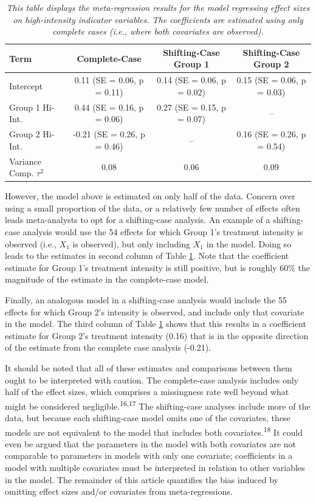 \documentclass[
]{article}
\begin{document}
\begin{table}

\caption{\label{tab:unnamed-chunk-3}\label{tab:ccadtexample} \textit{This table displays the meta-regression results for the model regressing effect sizes on high-intensity indicator variables. The coefficients are estimated using only complete cases (i.e., where both covariates are observed).}}
\centering
\begin{tabular}[t]{lccc}
\toprule
Term & Complete-Case & Shifting-Case Group 1 & Shifting-Case Group 2\\
\midrule
Intercept & 0.11 (SE = 0.06, p = 0.11) & 0.14 (SE = 0.06, p = 0.02) & 0.15 (SE = 0.06, p = 0.03)\\
Group 1 Hi-Int. & 0.44 (SE = 0.16, p = 0.06) & 0.27 (SE = 0.15, p = 0.07) & --\\
Group 2 Hi-Int. & -0.21 (SE = 0.26, p = 0.46) & -- & 0.16 (SE = 0.26, p = 0.54)\\
Variance Comp. $\tau^2$ & 0.08 & 0.06 & 0.09\\
\bottomrule
\end{tabular}
\end{table}

However, the model above is estimated on only half of the data.
Concern over using a small proportion of the data, or a relatively few number of effects often leads meta-analysts to opt for a shifting-case analysis.
An example of a shifting-case analysis would use the 54 effects for which Group 1's treatment intensity is observed (i.e., \(X_{1}\) is observed), but only including \(X_{1}\) in the model.
Doing so leads to the estimates in second column of Table \ref{tab:ccadtexample}.
Note that the coefficient estimate for Group 1's treatment intensity is still positive, but is roughly 60\% the magnitude of the estimate in the complete-case model.

Finally, an analogous model in a shifting-case analysis would include the 55 effects for which Group 2's intensity is observed, and include only that covariate in the model.
The third column of Table \ref{tab:ccadtexample} shows that this results in a coefficient estimate for Group 2's treatment intensity (0.16) that is in the opposite direction of the estimate from the complete case analysis (-0.21).

It should be noted that all of these estimates and comparisons between them ought to be interpreted with caution.
The complete-case analysis includes only half of the effect sizes, which comprises a missingness rate well beyond what might be considered negligible.\textsuperscript{16,17}
The shifting-case analyses include more of the data, but because each shifting-case model omits one of the covariates, these models are not equivalent to the model that includes both covariates.\textsuperscript{18}
It could even be argued that the parameters in the model with both covariates are not comparable to parameters in models with only one covariate; coefficients in a model with multiple covariates must be interpreted in relation to other variables in the model.
The remainder of this article quantifies the bias induced by omitting effect sizes and/or covariates from meta-regressions.
\end{document}
